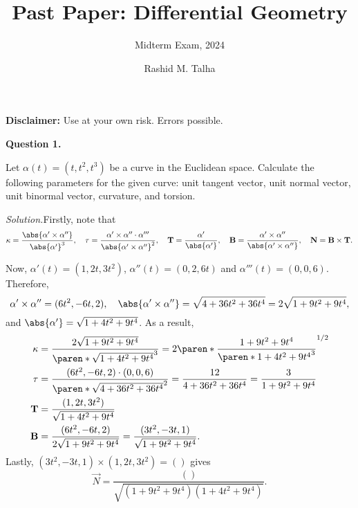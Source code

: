 \documentclass[11pt]{penrose}
\title{Past Paper: Differential Geometry}
\subtitle{Midterm Exam, 2024}
\author{Rashid M. Talha}
\begin{document}
\newenvironment{problem}[2][Question]{\textbf{#1 #2.}\par}{}
\newcommand{\solution}{\textit{Solution.}\hspace{2mm}}

\maketitle

\textbf{Disclaimer:} Use at your own risk. Errors possible.

\begin{problem}{1}
    Let $\alpha(t) = (t, t^2, t^3)$ be a curve in the Euclidean space. Calculate the following parameters for the given curve: unit tangent vector, unit normal vector, unit binormal vector, curvature, and torsion.

    \solution Firstly, note that
    \begin{equation*}
        \kappa = \frac{\abs{\alpha' \times \alpha''}}{\abs{\alpha'}^3},\quad
        \tau = \frac{\alpha' \times \alpha'' \cdot \alpha'''}{\abs{\alpha' \times \alpha''}^2},\quad
        \vec{T} = \frac{\alpha'}{\abs{\alpha'}},\quad
        \vec{B} = \frac{\alpha' \times \alpha''}{\abs{\alpha' \times \alpha''}},\quad
        \vec{N} = \vec{B} \times \vec{T}.
    \end{equation*}

    Now, $\alpha'(t) = (1, 2t, 3t^2)$, $\alpha''(t) = (0, 2, 6t)$ and $\alpha'''(t) = (0, 0, 6)$. Therefore,
    \begin{equation*}
        \alpha' \times \alpha'' = (6t^2, -6t, 2),\quad
        \abs{\alpha' \times \alpha''} = \sqrt{4 + 36t^2 + 36t^4} = 2\sqrt{1 + 9t^2 + 9t^4},
    \end{equation*}
    and $\abs{\alpha'} = \sqrt{1 + 4t^2 + 9t^4}$. As a result,
    \begin{align*}
        \kappa &= \frac{2\sqrt{1 + 9t^2 + 9t^4}}{\paren*{\sqrt{1 + 4t^2 + 9t^4}}^3} = 2 \paren*{\frac{1 + 9t^2 + 9t^4}{\paren*{1 + 4t^2 + 9t^4}^3}}^{1/2}\\
        \tau &= \frac{(6t^2, -6t, 2) \cdot (0,0,6)}{\paren*{\sqrt{4 + 36t^2 + 36t^4}}^2} = \frac{12}{4 + 36t^2 + 36t^4} = \frac{3}{1 + 9t^2 + 9t^4}\\
        \vec{T} &= \frac{(1, 2t, 3t^2)}{\sqrt{1 + 4t^2 + 9t^4}}\\
        \vec{B} &= \frac{(6t^2, -6t, 2)}{2\sqrt{1 + 9t^2 + 9t^4}} = \frac{(3t^2, -3t, 1)}{\sqrt{1 + 9t^2 + 9t^4}}.
    \end{align*}
    Lastly, $(3t^2, -3t, 1) \times (1, 2t, 3t^2) = ()$ gives
    \begin{equation*}
        \vec{N} = \frac{()}{\sqrt{(1 + 9t^2 + 9t^4) (1 + 4t^2 + 9t^4)}}.
    \end{equation*}
\end{problem}
\end{document}
